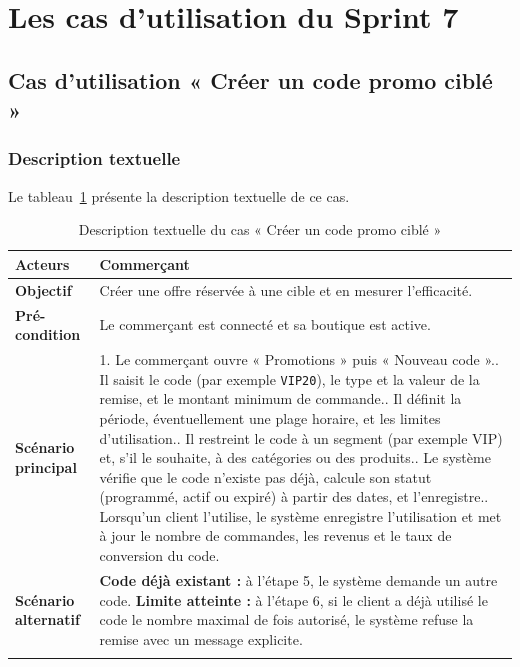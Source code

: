 \section{Les cas d'utilisation du Sprint 7}
\subsection{Cas d'utilisation « Créer un code promo ciblé »}
\subsubsection{Description textuelle}
Le tableau~\ref{tab:uc-coupon} présente la description textuelle de ce cas.
\renewcommand{\arraystretch}{1.5}
\begin{longtable}{|p{4cm}|p{11cm}|}
\hline
\textbf{Acteurs} & Commerçant \\
\hline
\textbf{Objectif} & Créer une offre réservée à une cible et en mesurer l'efficacité. \\
\hline
\textbf{Pré-condition} & Le commerçant est connecté et sa boutique est active. \\
\hline
\textbf{Scénario principal} &
1. Le commerçant ouvre « Promotions » puis « Nouveau code ».\newline
2. Il saisit le code (par exemple \texttt{VIP20}), le type et la valeur de la remise, et le montant minimum de commande.\newline
3. Il définit la période, éventuellement une plage horaire, et les limites d'utilisation.\newline
4. Il restreint le code à un segment (par exemple VIP) et, s'il le souhaite, à des catégories ou des produits.\newline
5. Le système vérifie que le code n'existe pas déjà, calcule son statut (programmé, actif ou expiré) à partir des dates, et l'enregistre.\newline
6. Lorsqu'un client l'utilise, le système enregistre l'utilisation et met à jour le nombre de commandes, les revenus et le taux de conversion du code. \\
\hline
\textbf{Scénario alternatif} &
\textbf{Code déjà existant :} à l'étape 5, le système demande un autre code.\newline
\textbf{Limite atteinte :} à l'étape 6, si le client a déjà utilisé le code le nombre maximal de fois autorisé, le système refuse la remise avec un message explicite. \\
\hline
\caption{Description textuelle du cas « Créer un code promo ciblé »}
\label{tab:uc-coupon}
\end{longtable}

